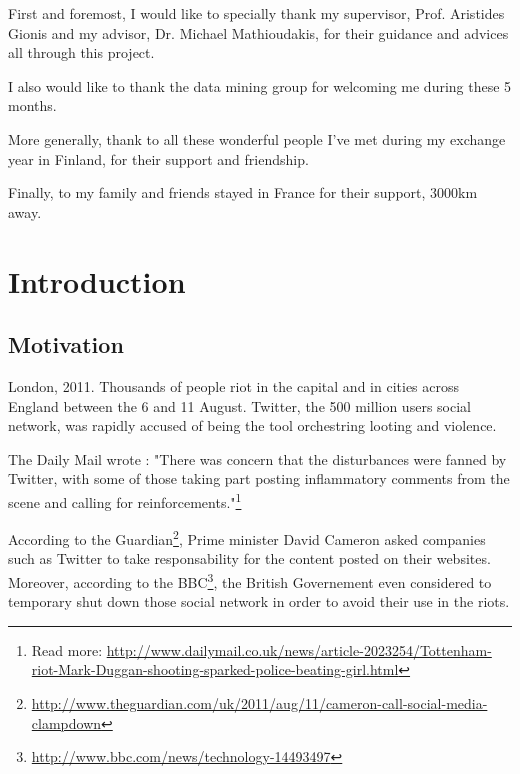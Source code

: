 \documentclass[a4paper,12pt]{report}
\begin{document}
First and foremost, I would like to specially thank my supervisor, Prof. Aristides Gionis and my advisor, Dr. Michael Mathioudakis, for their guidance and advices all through this project. 

I also would like to thank the data mining group for welcoming me during these 5 months.

More generally, thank to all these wonderful people I've met during my exchange year in Finland, for their support and friendship.

Finally, to my family and friends stayed in France for their support, 3000km away.



 


\chapter{Introduction}

\section{Motivation}

London, 2011. Thousands of people riot in the capital and in cities across England between the 6 and 11 August. Twitter, the 500 million users social network, was rapidly accused of being the tool orchestring looting and violence.

The Daily Mail wrote : 
"There was concern that the disturbances were fanned by Twitter, with some of those taking part posting inflammatory comments from the scene and calling for reinforcements."\footnote{\noindent Read more: \url{http://www.dailymail.co.uk/news/article-2023254/Tottenham-riot-Mark-Duggan-shooting-sparked-police-beating-girl.html}}

According to the Guardian\footnote{\url{http://www.theguardian.com/uk/2011/aug/11/cameron-call-social-media-clampdown}}, Prime minister David Cameron asked companies such as Twitter to take responsability for the content posted on their websites. Moreover, according to the BBC\footnote{\url{http://www.bbc.com/news/technology-14493497}}, the British Governement even considered to temporary shut down those social network in order to avoid their use in the riots.
\end{document}
